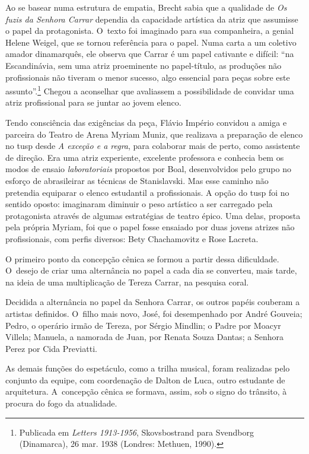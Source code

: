 {Ao se basear numa estrutura de empatia, Brecht sabia que a qualidade de
{\it Os fuzis da Senhora Carrar} dependia da capacidade artística da
atriz que assumisse o papel da protagonista. O~texto foi imaginado para
sua companheira, a genial Helene Weigel, que se tornou referência para o
papel. Numa carta a um coletivo amador dinamarquês, ele observa que
Carrar é um papel cativante e difícil: “na Escandinávia, sem uma atriz
proeminente no papel-título, as produções não profissionais não tiveram
o menor sucesso, algo essencial para peças sobre este
assunto”.\footnote{Publicada em {\it Letters 1913-1956}, Skovsbostrand
  para Svendborg (Dinamarca), 26 mar. 1938 (Londres: Methuen, 1990).}
Chegou a aconselhar que avaliassem a possibilidade de convidar uma atriz
profissional para se juntar ao jovem elenco.

Tendo consciência das exigências da peça, Flávio Império convidou a
amiga e parceira do Teatro de Arena Myriam Muniz, que realizava a
preparação de elenco no {\sc tusp} desde {\it A exceção e a regra}, para
colaborar mais de perto, como assistente de direção. Era uma atriz
experiente, excelente professora e conhecia bem os modos de ensaio
{\it laboratoriais} propostos por Boal, desenvolvidos pelo grupo no
esforço de abrasileirar as técnicas de Stanislavski. Mas esse
caminho não pretendia equiparar o elenco estudantil a profissionais. A
opção do {\sc tusp} foi no sentido oposto: imaginaram diminuir o peso
artístico a ser carregado pela protagonista através de algumas
estratégias de teatro épico. Uma delas, proposta pela própria Myriam,
foi que o papel fosse ensaiado por duas jovens atrizes
não profissionais, com perfis diversos: Bety Chachamovitz e Rose
Lacreta.

O primeiro ponto da concepção cênica se formou a partir dessa
dificuldade. O~desejo de criar uma alternância no papel a cada dia se
converteu, mais tarde, na ideia de uma multiplicação de Tereza Carrar,
na pesquisa coral.

Decidida a alternância no papel da Senhora Carrar, os outros papéis
couberam a artistas definidos. O~filho mais novo, José, foi desempenhado
por André Gouveia; Pedro, o operário irmão de Tereza, por Sérgio
Mindlin; o Padre por Moacyr Villela; Manuela, a namorada de Juan, por
Renata Souza Dantas; a Senhora Perez por Cida Previatti.

As demais funções do espetáculo, como a trilha musical, foram realizadas
pelo conjunto da equipe, com coordenação de Dalton de Luca, outro
estudante de arquitetura. A~concepção cênica se formava, assim, sob o
signo do trânsito, à procura do fogo da atualidade.

}
